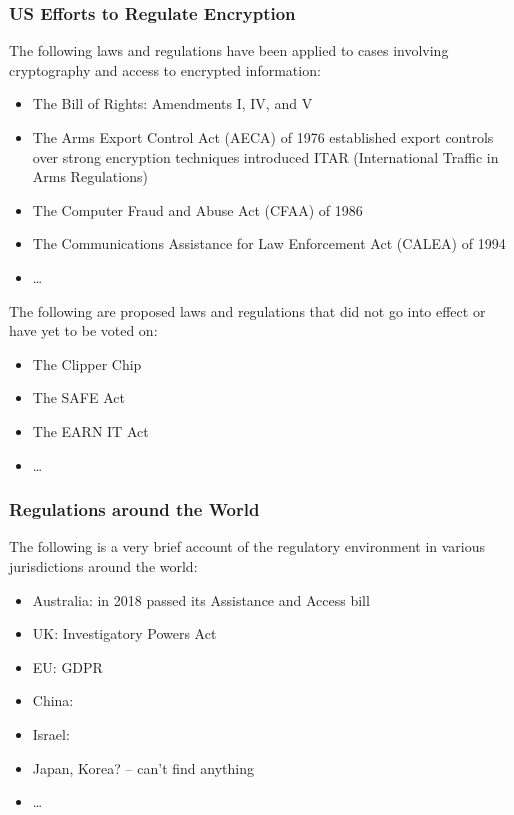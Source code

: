 \subsubsection*{US Efforts to Regulate Encryption}

The following laws and regulations have been applied to cases involving cryptography and access to encrypted
information:

\begin{itemize}
    \item The Bill of Rights: Amendments I, IV, and V \cite{madison_1791}
    \item The Arms Export Control Act (AECA) of 1976 established export controls over strong encryption techniques
        introduced ITAR (International Traffic in Arms Regulations) \cite{morgan_hr13680_1976} \cite{kehl_right_2015}
    \item The Computer Fraud and Abuse Act (CFAA) of 1986 \cite{hughes_hr4718_1986} \cite{wolff_computer_2016}
    \item The Communications Assistance for Law Enforcement Act (CALEA) of 1994 \cite{edwards_hr4922_1994}
    \item \dots
\end{itemize}

The following are proposed laws and regulations that did not go into effect or have yet to be voted on:

\begin{itemize}
    \item The Clipper Chip \cite{press_1993} \cite{thompson_2015}
    \item The SAFE Act \cite{goodlatte_hr3011_1996}
    \item The EARN IT Act \cite{graham_s3398_2020}
    \item \dots
\end{itemize}

\subsubsection*{Regulations around the World}

The following is a very brief account of the regulatory environment in various jurisdictions around the world:

\begin{itemize}
    \item Australia: in 2018 passed its Assistance and Access bill \cite{ag_2018} \cite{newman_2018}
    \item UK: Investigatory Powers Act \cite{legislature_2016}
    \item EU: GDPR
    \item China: \cite{donahue_comparative_2018}
    \item Israel: \cite{donahue_comparative_2018}
    \item Japan, Korea? -- can't find anything
    \item \dots
\end{itemize}

